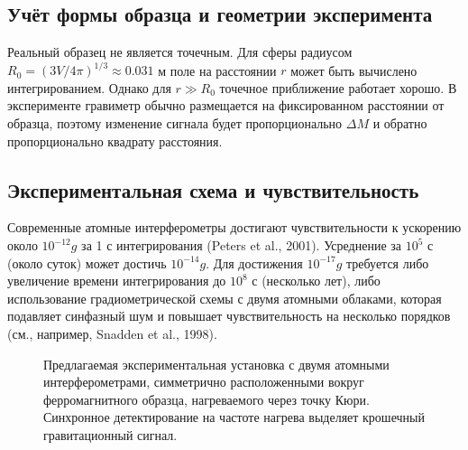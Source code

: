 \documentclass[12pt]{article}
\theoremstyle{remark}
\begin{document}
	
	\subsection{Учёт формы образца и геометрии эксперимента}
	\label{subsec:lab-geometry}
	
	Реальный образец не является точечным. Для сферы радиусом $R_0 = (3V/4\pi)^{1/3} \approx 0.031$ м поле на расстоянии $r$ может быть вычислено интегрированием. Однако для $r \gg R_0$ точечное приближение работает хорошо. В эксперименте гравиметр обычно размещается на фиксированном расстоянии от образца, поэтому изменение сигнала будет пропорционально $\Delta M$ и обратно пропорционально квадрату расстояния.
	
	\subsection{Экспериментальная схема и чувствительность}
	\label{subsec:lab-scheme}
	
	Современные атомные интерферометры достигают чувствительности к ускорению около $10^{-12}g$ за 1 с интегрирования (Peters et al., 2001). Усреднение за $10^5$ с (около суток) может достичь $10^{-14}g$. Для достижения $10^{-17}g$ требуется либо увеличение времени интегрирования до $10^8$ с (несколько лет), либо использование градиометрической схемы с двумя атомными облаками, которая подавляет синфазный шум и повышает чувствительность на несколько порядков (см., например, Snadden et al., 1998).
	
	\begin{figure}[htbp]
		\centering
		\caption{Предлагаемая экспериментальная установка с двумя атомными интерферометрами, симметрично расположенными вокруг ферромагнитного образца, нагреваемого через точку Кюри. Синхронное детектирование на частоте нагрева выделяет крошечный гравитационный сигнал.}
		\label{fig:lab-setup}
	\end{figure}
	
\end{document}

